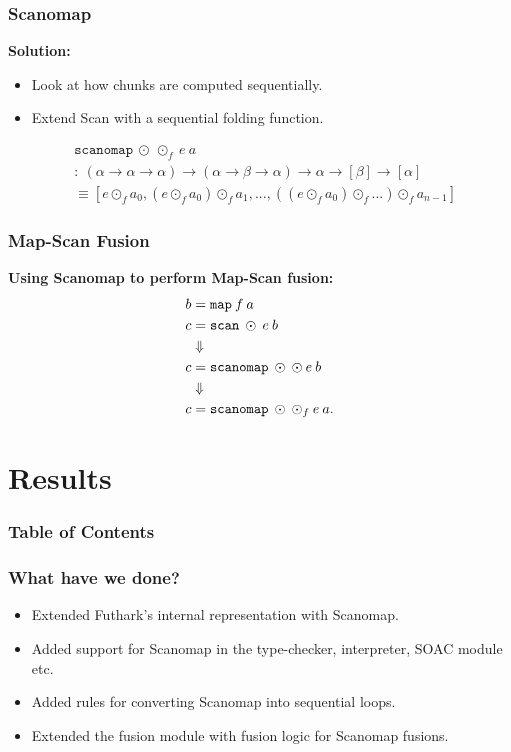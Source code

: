\documentclass{beamer}
\begin{document}
\begin{frame}

 \frametitle{Scanomap}
\large \textbf{Solution:}
 \begin{itemize}
 \item Look at how chunks are computed sequentially.
 \item Extend Scan with a sequential folding function.
 \end{itemize}
 \begin{align*}
   &\mathtt{scanomap} \: \odot \: \odot_f \: e \: a \: \\ &: \:(\alpha \to \alpha \to \alpha) \to (\alpha \to \beta \to \alpha)
 \to \alpha \to [\beta] \to [\alpha] \\
&\equiv
 [e \odot_f a_0, (e \odot_f a_0) \odot_f a_1, ..., ((e \odot_f a_0) \odot_f ...) \odot_f a_{n-1}]
 \end{align*}
\end{frame}


\begin{frame}

 \frametitle{Map-Scan Fusion}
\large \textbf{Using Scanomap to perform Map-Scan fusion:}
\begin{align*}
  b &= \mathtt{map} \: f \: a \\
  c &= \mathtt{scan} \: \odot \: e \: b \\
&\Downarrow \\
  c &= \mathtt{scanomap} \: \odot \: \odot \: e \: b \\
&\Downarrow \\
  c &= \mathtt{scanomap} \: \odot \: \odot_f \: e \: a\mathnormal{.}
\end{align*}
\end{frame}
\section[impl]{Results}
\begin{frame}
\frametitle{Table of Contents}
\tableofcontents[currentsection]
\end{frame}

\begin{frame}
 \frametitle{What have we done?}
 \begin{itemize}
 \item Extended Futhark's internal representation with Scanomap.
 \item Added support for Scanomap in the type-checker, interpreter, SOAC module etc.
 \item Added rules for converting Scanomap into sequential loops.
 \item Extended the fusion module with fusion logic for Scanomap fusions.
 \end{itemize}
\end{frame}
\end{document}
